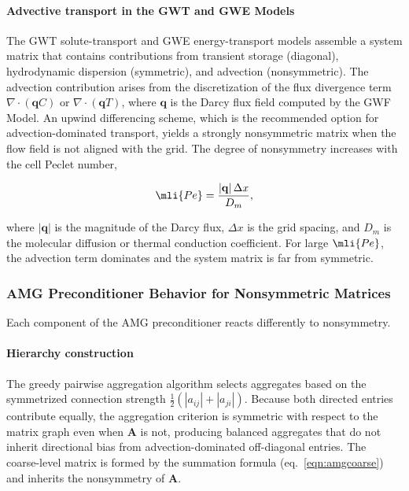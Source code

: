 \paragraph{Advective transport in the GWT and GWE Models}
The GWT solute-transport \citep{modflow6gwt} and GWE energy-transport \citep{morway2025} models assemble a system matrix that contains contributions from transient storage (diagonal), hydrodynamic dispersion (symmetric), and advection (nonsymmetric). The advection contribution arises from the discretization of the flux divergence term $\nabla \cdot (\mathbf{q} C)$ or $\nabla \cdot (\mathbf{q} T)$, where $\mathbf{q}$ is the Darcy flux field computed by the GWF Model. An upwind differencing scheme, which is the recommended option for advection-dominated transport, yields a strongly nonsymmetric matrix when the flow field is not aligned with the grid. The degree of nonsymmetry increases with the cell Peclet number,

\begin{equation}
  \label{eqn:peclet}
  \mli{Pe} = \frac{|\mathbf{q}| \, \Delta x}{D_m} ,
\end{equation}

\noindent where $|\mathbf{q}|$ is the magnitude of the Darcy flux, $\Delta x$ is the grid spacing, and $D_m$ is the molecular diffusion or thermal conduction coefficient. For large $\mli{Pe}$, the advection term dominates and the system matrix is far from symmetric.

\subsubsection{AMG Preconditioner Behavior for Nonsymmetric Matrices}

Each component of the AMG preconditioner reacts differently to nonsymmetry.

\paragraph{Hierarchy construction}
The greedy pairwise aggregation algorithm selects aggregates based on the symmetrized connection strength $\frac{1}{2}(|a_{ij}| + |a_{ji}|)$. Because both directed entries contribute equally, the aggregation criterion is symmetric with respect to the matrix graph even when $\mathbf{A}$ is not, producing balanced aggregates that do not inherit directional bias from advection-dominated off-diagonal entries. The coarse-level matrix is formed by the summation formula (eq.~\ref{eqn:amgcoarse}) and inherits the nonsymmetry of $\mathbf{A}$.

